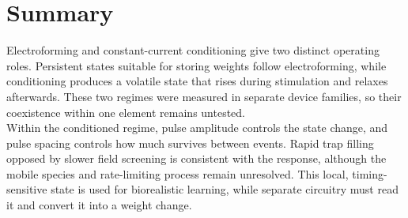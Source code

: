 \FloatBarrier

\section[Summary]{Summary}

\noindent Electroforming and constant-current conditioning give  two distinct operating roles.
Persistent states suitable for storing weights follow electroforming, while conditioning produces a volatile state
that rises during stimulation and relaxes afterwards. These two regimes were measured in separate device families, so
their coexistence within one element remains untested.\\

\noindent Within the conditioned regime, pulse amplitude controls the state change, and pulse spacing controls how
much survives between events. Rapid trap filling opposed by slower field screening is consistent with the response,
although the mobile species and rate-limiting process remain unresolved. This local, timing-sensitive state is used
for biorealistic learning, while separate circuitry must read it and convert it into a weight change.
